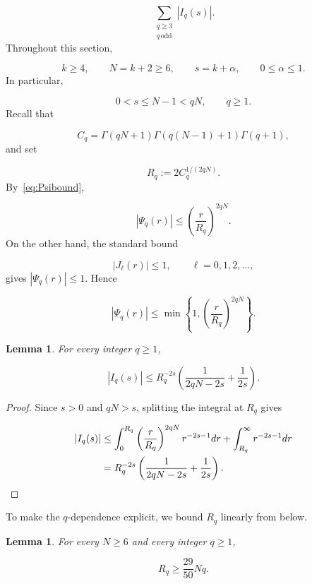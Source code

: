 \documentclass[11pt]{article}
\theoremstyle{plain}
\newtheorem{lemma}[theorem]{Lemma}
\theoremstyle{definition}
\theoremstyle{remark}
\begin{document}
\[
  \sum_{\substack{q \ge 3 \\ q \,\mathrm{odd}}} |I_q(s)| .
\]
Throughout this section,

\[
  k \ge 4, \qquad  N = k+2 \ge 6, \qquad  s = k+\alpha , \qquad  0 \le \alpha \le 1 .
\]
In particular,

\[
  0 < s \le N-1 < qN , \qquad  q \ge 1 .
\]
Recall that

\[
  C_q = \Gamma (qN+1)\Gamma (q(N-1)+1)\Gamma (q+1) ,
\]
and set

\[
  R_q := 2C_q^{1/(2qN)} .
\]
By~\eqref{eq:Psibound},

\[
  |\Psi_q(r)| \le \left( \frac{r}{R_q} \right)^{2qN} .
\]
On the other hand, the standard bound

\[
  |J_\ell (r)| \le 1 , \qquad  \ell = 0,1,2,\dots ,
\]
gives $|\Psi_q(r)| \le 1$. Hence

\[
  |\Psi_q(r)| \le \min \left\{ 1, \left( \frac{r}{R_q} \right)^{2qN} \right\} .
\]

\begin{lemma}\label{res:5.1}
For every integer $q \ge 1$,

\[
  |I_q(s)| \le R_q^{-2s} \left( \frac{1}{2qN - 2s} + \frac{1}{2s} \right) .
\]
\end{lemma}

\begin{proof}
Since $s > 0$ and $qN > s$, splitting the integral at $R_q$ gives

\begin{align*}
  |I_q(s)| &\le \int_{0}^{R_q} \left( \frac{r}{R_q} \right)^{2qN} r^{-2s-1} dr + \int_{R_q}^{\infty } r^{-2s-1} dr \\
  &= R_q^{-2s} \left( \frac{1}{2qN - 2s} + \frac{1}{2s} \right) . \qedhere
\end{align*}
\end{proof}

To make the $q$-dependence explicit, we bound $R_q$ linearly from below.

\begin{lemma}\label{res:5.2}
For every $N \ge 6$ and every integer $q \ge 1$,

\[
  R_q \ge \frac{29}{50} Nq .
\]
\end{lemma}
\end{document}
